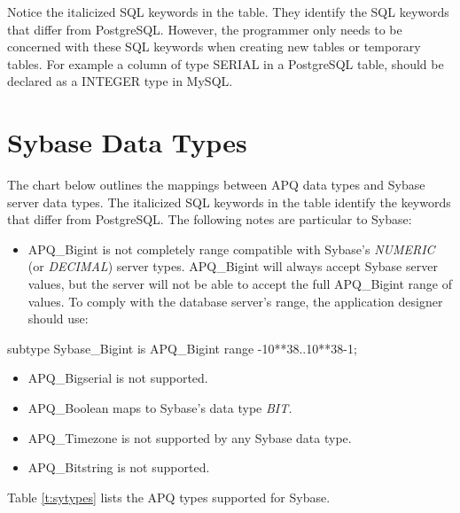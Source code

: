 \documentclass[english,letterpaper]{book}
\begin{document}
Notice the italicized SQL keywords in the table. They identify the
SQL keywords that differ from PostgreSQL. However, the programmer
only needs to be concerned with these SQL keywords when creating new
tables or temporary tables. For example a column of type SERIAL in
a PostgreSQL table, should be declared as a INTEGER type in MySQL.


\section{Sybase Data Types}

The chart below outlines the mappings between APQ data types and Sybase
server data types. The italicized SQL keywords
 in the table identify
the keywords that differ from PostgreSQL. The following notes are
particular to Sybase:

\begin{itemize}	
   \item APQ\_Bigint is not completely range compatible with Sybase's \emph{NUMERIC}
         (or \emph{DECIMAL}) server types. APQ\_Bigint will always accept Sybase server
         values, but the server will not be able to accept the full APQ\_Bigint range of values.
         To comply with the database server's range,
         the application designer should use:
\end{itemize}

\begin{Code}
subtype Sybase_Bigint is APQ_Bigint
   range -10**38..10**38-1;
\end{Code}

\begin{itemize}
   \item APQ\_Bigserial is not supported.
   \item APQ\_Boolean  maps to Sybase's data type \emph{BIT.}
   \item APQ\_Timezone is not supported by any Sybase data type.
   \item APQ\_Bitstring is not supported.
\end{itemize}

Table \ref{t:sytypes} lists the APQ types supported for Sybase.
\end{document}
